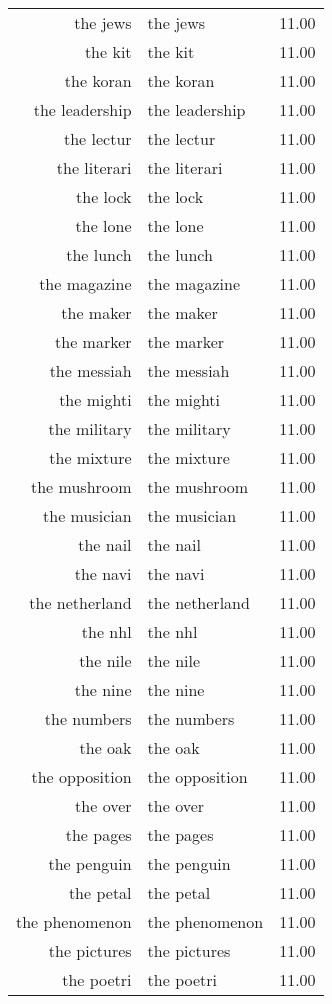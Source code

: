 \begin{table}[ht]
\begin{tabular}{rlr}
  the jews & the jews & 11.00 \\ 
  the kit & the kit & 11.00 \\ 
  the koran & the koran & 11.00 \\ 
  the leadership & the leadership & 11.00 \\ 
  the lectur & the lectur & 11.00 \\ 
  the literari & the literari & 11.00 \\ 
  the lock & the lock & 11.00 \\ 
  the lone & the lone & 11.00 \\ 
  the lunch & the lunch & 11.00 \\ 
  the magazine & the magazine & 11.00 \\ 
  the maker & the maker & 11.00 \\ 
  the marker & the marker & 11.00 \\ 
  the messiah & the messiah & 11.00 \\ 
  the mighti & the mighti & 11.00 \\ 
  the military & the military & 11.00 \\ 
  the mixture & the mixture & 11.00 \\ 
  the mushroom & the mushroom & 11.00 \\ 
  the musician & the musician & 11.00 \\ 
  the nail & the nail & 11.00 \\ 
  the navi & the navi & 11.00 \\ 
  the netherland & the netherland & 11.00 \\ 
  the nhl & the nhl & 11.00 \\ 
  the nile & the nile & 11.00 \\ 
  the nine & the nine & 11.00 \\ 
  the numbers & the numbers & 11.00 \\ 
  the oak & the oak & 11.00 \\ 
  the opposition & the opposition & 11.00 \\ 
  the over & the over & 11.00 \\ 
  the pages & the pages & 11.00 \\ 
  the penguin & the penguin & 11.00 \\ 
  the petal & the petal & 11.00 \\ 
  the phenomenon & the phenomenon & 11.00 \\ 
  the pictures & the pictures & 11.00 \\ 
  the poetri & the poetri & 11.00 \\ 

\end{tabular}
\end{table}

